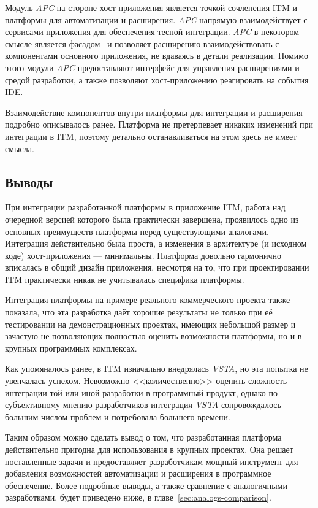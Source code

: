 Модуль {\it APC} на стороне хост-приложения является точкой сочленения ITM и платформы для автоматизации и расширения. {\it APC} напрямую взаимодействует с сервисами приложения для обеспечения тесной интеграции. {\it APC} в некотором смысле является фасадом~\cite{band-four} и позволяет расширению взаимодействовать с компонентами основного приложения, не вдаваясь в детали реализации. Помимо этого модули {\it APC} предоставляют интерфейс для управления расширениями и средой разработки, а также позволяют хост-приложению реагировать на события IDE.

Взаимодействие компонентов внутри платформы для интеграции и расширения подробно описывалось ранее. Платформа не претерпевает никаких изменений при интеграции в ITM, поэтому детально останавливаться на этом здесь не имеет смысла.

\subsection{Выводы}

При интеграции разработанной платформы в приложение ITM, работа над очередной версией которого была практически завершена, проявилось одно из основных преимуществ платформы перед существующими аналогами. Интеграция действительно была проста, а изменения в архитектуре (и исходном коде) хост-приложения --- минимальны. Платформа довольно гармонично вписалась в общий дизайн приложения, несмотря на то, что при проектировании ITM практически никак не учитывалась специфика платформы. 

Интеграция платформы на примере реального коммерческого проекта также показала, что эта разработка даёт хорошие результаты не только при её тестировании на демонстрационных проектах, имеющих небольшой размер и зачастую не позволяющих полностью оценить возможности платформы, но и в крупных программных комплексах.

Как упомяналось ранее, в ITM изначально внедрялась {\it VSTA}, но эта попытка не увенчалась успехом. Невозможно <<количественно>> оценить сложность интеграции той или иной разработки в программный продукт, однако по субъективному мнению разработчиков интеграция {\it VSTA} сопровождалось большим числом проблем и потребовала большего времени.

Таким образом можно сделать вывод о том, что разработанная платформа действительно пригодна для использования в крупных проектах. Она решает поставленные задачи и предоставляет разработчикам мощный инструмент для добавления возможностей автоматизации и расширения в программное обеспечение. Более подробные выводы, а также сравнение с аналогичными разработками, будет приведено ниже, в главе~\ref{sec:analogs-comparison}.

\pagebreak
